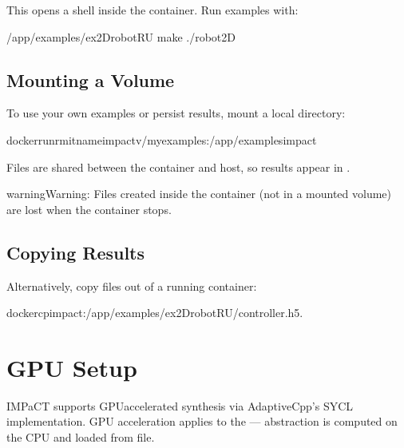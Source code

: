 \documentclass[a4paper,10pt,english]{sphinxmanual}
\begin{document}
\sphinxAtStartPar
This opens a shell inside the container. Run examples with:

\begin{sphinxVerbatim}[commandchars=\\\{\}]
/app/examples/ex\PYGZus{}2Drobot\PYGZhy{}R\PYGZhy{}U
make
./robot2D
\end{sphinxVerbatim}


\subsection{Mounting a Volume}
\label{\detokenize{getting-started/docker:mounting-a-volume}}
\sphinxAtStartPar
To use your own examples or persist results, mount a local directory:

\begin{sphinxVerbatim}[commandchars=\\\{\}]
dockerrun\PYGZhy{}\PYGZhy{}rm\PYGZhy{}it\PYGZhy{}\PYGZhy{}nameimpact\PYGZhy{}v\PYGZti{}/my\PYGZhy{}examples:/app/examplesimpact
\end{sphinxVerbatim}

\sphinxAtStartPar
Files are shared between the container and host, so results appear in .

\begin{sphinxadmonition}{warning}{Warning:}
\sphinxAtStartPar
Files created inside the container (not in a mounted volume) are lost when the
container stops.
\end{sphinxadmonition}


\subsection{Copying Results}
\label{\detokenize{getting-started/docker:copying-results}}
\sphinxAtStartPar
Alternatively, copy files out of a running container:

\begin{sphinxVerbatim}[commandchars=\\\{\}]
dockercpimpact:/app/examples/ex\PYGZus{}2Drobot\PYGZhy{}R\PYGZhy{}U/controller.h5.
\end{sphinxVerbatim}

\sphinxstepscope


\section{GPU Setup}
\label{\detokenize{getting-started/gpu:gpu-setup}}\label{\detokenize{getting-started/gpu::doc}}
\sphinxAtStartPar
IMPaCT supports GPU\sphinxhyphen{}accelerated synthesis via AdaptiveCpp’s SYCL implementation.
GPU acceleration applies to the  — abstraction is
computed on the CPU and loaded from file.
\end{document}
